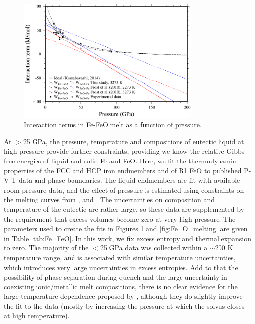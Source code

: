 \documentclass[review]{elsarticle}
\begin{document}
\begin{figure}[ht!]
  \centering
  \includegraphics[width=0.8\textwidth]{figures/Fe_FeO_interaction_terms}
  \caption{Interaction terms in Fe-FeO melt as a function of pressure.}
  \label{fig:Fe_O_interaction}
\end{figure}

At $>$25 GPa, the pressure, temperature and compositions of eutectic liquid at high pressure \citep{SHCPW2008} provide further constraints, providing we know the relative Gibbs free energies of liquid and solid Fe and FeO. Here, we fit the thermodynamic properties of the FCC and HCP iron endmembers and of B1 FeO to published P-V-T data and phase boundaries. The liquid endmembers are fit with available room pressure data, and the effect of pressure is estimated using constraints on the melting curves from \cite{ADMLM2013}, \cite{SHCPW2008} and \cite{OTHOH2011}. The uncertainties on composition and temperature of the eutectic are rather large, so these data are supplemented by the requirement that excess volumes become zero at very high pressure. The parameters used to create the fits in Figures \ref{fig:Fe_O_interaction} and \ref{fig:Fe_O_melting} are given in Table \ref{tab:Fe_FeO}. In this work, we fix excess entropy and thermal expansion to zero. The majority of the $<$25 GPa data was collected within a $\sim$200 K temperature range, and is associated with similar temperature uncertainties, which introduces very large uncertainties in excess entropies. Add to that the possibility of phase separation during quench and the large uncertainty in coexisting ionic/metallic melt compositions, there is no clear evidence for the large temperature dependence proposed by \cite{Frostetal2010}, although they do slightly improve the fit to the data (mostly by increasing the pressure at which the solvus closes at high temperature).
\end{document}
